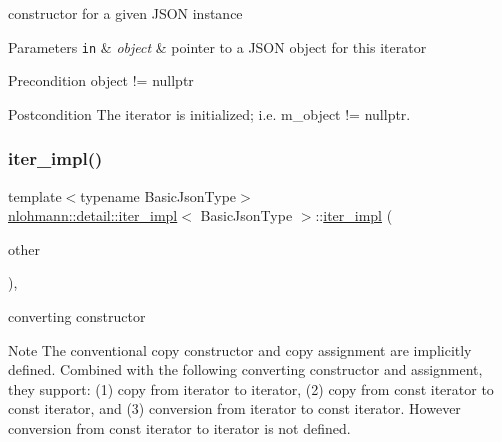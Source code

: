 constructor for a given J\+S\+ON instance 


\begin{DoxyParams}[1]{Parameters}
\mbox{\tt in}  & {\em object} & pointer to a J\+S\+ON object for this iterator \\
\hline
\end{DoxyParams}
\begin{DoxyPrecond}{Precondition}
object != nullptr 
\end{DoxyPrecond}
\begin{DoxyPostcond}{Postcondition}
The iterator is initialized; i.\+e. {\ttfamily m\+\_\+object != nullptr}. 
\end{DoxyPostcond}
\mbox{\label{classnlohmann_1_1detail_1_1iter__impl_a867f7eb55091be31b013adb3e46816d3}} 
\subsubsection{\texorpdfstring{iter\+\_\+impl()}{iter\_impl()}\hspace{0.1cm}{\footnotesize\ttfamily [3/3]}}
{\footnotesize\ttfamily template$<$typename Basic\+Json\+Type$>$ \\
\hyperlink{classnlohmann_1_1detail_1_1iter__impl}{nlohmann\+::detail\+::iter\+\_\+impl}$<$ Basic\+Json\+Type $>$\+::\hyperlink{classnlohmann_1_1detail_1_1iter__impl}{iter\+\_\+impl} (\begin{DoxyParamCaption}\item[{const \hyperlink{classnlohmann_1_1detail_1_1iter__impl}{iter\+\_\+impl}$<$ typename std\+::remove\+\_\+const$<$ Basic\+Json\+Type $>$\+::type $>$ \&}]{other }\end{DoxyParamCaption})\hspace{0.3cm}{\ttfamily [inline]}, {\ttfamily [noexcept]}}



converting constructor 

\begin{DoxyNote}{Note}
The conventional copy constructor and copy assignment are implicitly defined. Combined with the following converting constructor and assignment, they support\+: (1) copy from iterator to iterator, (2) copy from const iterator to const iterator, and (3) conversion from iterator to const iterator. However conversion from const iterator to iterator is not defined.
\end{DoxyNote}

